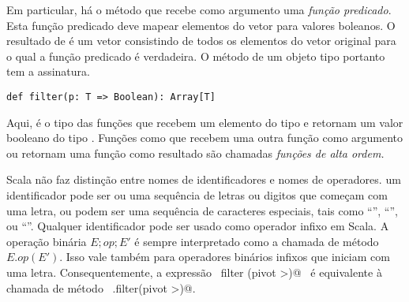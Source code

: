 Em particular, h\'{a} o m\'{e}todo  que recebe como argumento uma
{\em fun\c{c}\~{a}o predicado}. Esta fun\c{c}\~{a}o predicado deve mapear elementos do 
vetor para valores boleanos. O resultado de  \'{e} um vetor
consistindo de todos os elementos do vetor original para o qual a fun\c{c}\~{a}o
predicado \'{e} verdadeira. O m\'{e}todo  de um objeto tipo
 portanto tem a assinatura. 


\begin{lstlisting}
def filter(p: T => Boolean): Array[T]
\end{lstlisting}

Aqui,  \'{e} o tipo das fun\c{c}\~{o}es que recebem um elemento 
do tipo  e retornam um valor booleano do tipo . 
Fun\c{c}\~{o}es como  
que recebem uma outra fun\c{c}\~{a}o como argumento ou retornam uma fun\c{c}\~{a}o como
resultado s\~{a}o chamadas {\em fun\c{c}\~{o}es de alta ordem.}     

Scala n\~{a}o faz distin\c{c}\~{a}o entre nomes de identificadores e nomes de operadores.
um identificador pode ser ou uma sequ\^{e}ncia de letras ou digitos que come\c{c}am
com uma letra, ou podem ser uma sequ\^{e}ncia de caracteres especiais, tais como 
``\code{+}'', ``\code{*}'', ou ``\code{:}''.  Qualquer identificador pode
ser usado como operador infixo em Scala. A opera\c{c}\~{a}o bin\'{a}ria $E;op;E'$ \'{e} sempre
interpretado como a chamada de m\'{e}todo $E.op(E')$. Isso vale tamb\'{e}m para 
operadores bin\'{a}rios infixos que iniciam com uma letra. Consequentemente,
a express\~{a}o  ~\lstinline@xs filter (pivot >)@~ \'{e} equivalente à chamada de
m\'{e}todo ~\lstinline@xs.filter(pivot >)@.



